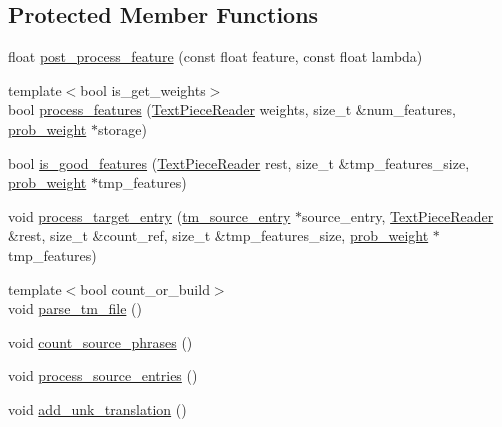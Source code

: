 \subsection*{Protected Member Functions}
\begin{DoxyCompactItemize}
\item 
float \hyperlink{classuva_1_1smt_1_1bpbd_1_1server_1_1tm_1_1builders_1_1tm__basic__builder_a55ed944c97e2e9896b6ada55899b9828}{post\+\_\+process\+\_\+feature} (const float feature, const float lambda)
\item 
{\footnotesize template$<$bool is\+\_\+get\+\_\+weights$>$ }\\bool \hyperlink{classuva_1_1smt_1_1bpbd_1_1server_1_1tm_1_1builders_1_1tm__basic__builder_a4c6287cfd6d5a415f326445825fadc86}{process\+\_\+features} (\hyperlink{classuva_1_1utils_1_1file_1_1_text_piece_reader}{Text\+Piece\+Reader} weights, size\+\_\+t \&num\+\_\+features, \hyperlink{namespaceuva_1_1smt_1_1bpbd_1_1server_a01e9ea4de9c226f4464862e84ff0bbcc}{prob\+\_\+weight} $\ast$storage)
\item 
bool \hyperlink{classuva_1_1smt_1_1bpbd_1_1server_1_1tm_1_1builders_1_1tm__basic__builder_aef8c8ab701465ff1c201a7e7f75a8cf6}{is\+\_\+good\+\_\+features} (\hyperlink{classuva_1_1utils_1_1file_1_1_text_piece_reader}{Text\+Piece\+Reader} rest, size\+\_\+t \&tmp\+\_\+features\+\_\+size, \hyperlink{namespaceuva_1_1smt_1_1bpbd_1_1server_a01e9ea4de9c226f4464862e84ff0bbcc}{prob\+\_\+weight} $\ast$tmp\+\_\+features)
\item 
void \hyperlink{classuva_1_1smt_1_1bpbd_1_1server_1_1tm_1_1builders_1_1tm__basic__builder_a97dc0781341ddaa5aa30812b7aa00552}{process\+\_\+target\+\_\+entry} (\hyperlink{classuva_1_1smt_1_1bpbd_1_1server_1_1tm_1_1models_1_1tm__source__entry}{tm\+\_\+source\+\_\+entry} $\ast$source\+\_\+entry, \hyperlink{classuva_1_1utils_1_1file_1_1_text_piece_reader}{Text\+Piece\+Reader} \&rest, size\+\_\+t \&count\+\_\+ref, size\+\_\+t \&tmp\+\_\+features\+\_\+size, \hyperlink{namespaceuva_1_1smt_1_1bpbd_1_1server_a01e9ea4de9c226f4464862e84ff0bbcc}{prob\+\_\+weight} $\ast$tmp\+\_\+features)
\item 
{\footnotesize template$<$bool count\+\_\+or\+\_\+build$>$ }\\void \hyperlink{classuva_1_1smt_1_1bpbd_1_1server_1_1tm_1_1builders_1_1tm__basic__builder_ae343a8c5d672c4c530f11eee3c19d3ee}{parse\+\_\+tm\+\_\+file} ()
\item 
void \hyperlink{classuva_1_1smt_1_1bpbd_1_1server_1_1tm_1_1builders_1_1tm__basic__builder_a3a746c653bfdbc8d5e8ad1b8393ba578}{count\+\_\+source\+\_\+phrases} ()
\item 
void \hyperlink{classuva_1_1smt_1_1bpbd_1_1server_1_1tm_1_1builders_1_1tm__basic__builder_ab815d0b80278bea0ab5fdc9a527fa6f2}{process\+\_\+source\+\_\+entries} ()
\item 
void \hyperlink{classuva_1_1smt_1_1bpbd_1_1server_1_1tm_1_1builders_1_1tm__basic__builder_a3990eaf128683fa52c8a43a1498bbf6c}{add\+\_\+unk\+\_\+translation} ()
\end{DoxyCompactItemize}



